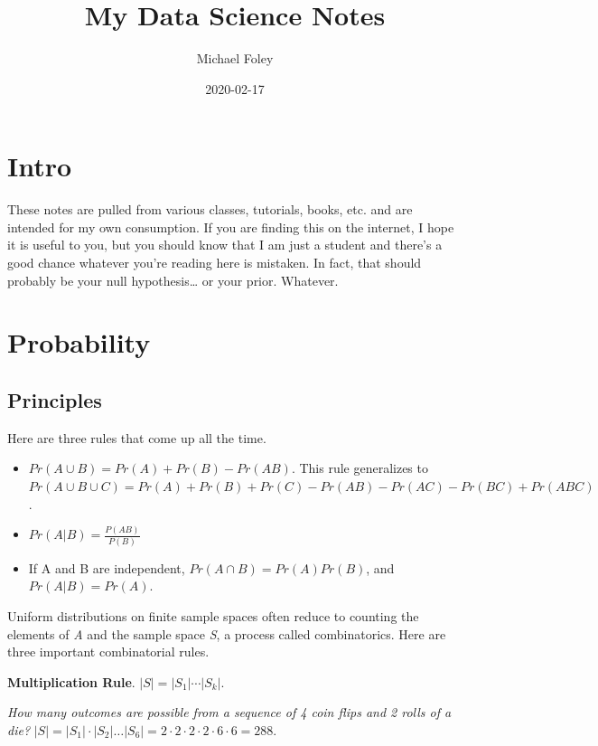 \documentclass[
]{book}
\title{My Data Science Notes}
\author{Michael Foley}
\date{2020-02-17}
\begin{document}
\maketitle

{
\setcounter{tocdepth}{1}
\tableofcontents
}
\hypertarget{intro}{%
\chapter*{Intro}\label{intro}}

These notes are pulled from various classes, tutorials, books, etc. and are intended for my own consumption. If you are finding this on the internet, I hope it is useful to you, but you should know that I am just a student and there's a good chance whatever you're reading here is mistaken. In fact, that should probably be your null hypothesis\ldots{} or your prior. Whatever.

\hypertarget{probability}{%
\chapter{Probability}\label{probability}}

\hypertarget{principles}{%
\section{Principles}\label{principles}}

Here are three rules that come up all the time.

\begin{itemize}
\item
  \(Pr(A \cup B) = Pr(A)+Pr(B) - Pr(AB)\). This rule generalizes to
  \(Pr(A \cup B \cup C)=Pr(A)+Pr(B)+Pr(C)-Pr(AB)-Pr(AC)-Pr(BC)+Pr(ABC)\).
\item
  \(Pr(A|B) = \frac{P(AB)}{P(B)}\)
\item
  If A and B are independent, \(Pr(A \cap B) = Pr(A)Pr(B)\), and \(Pr(A|B)=Pr(A)\).
\end{itemize}

Uniform distributions on finite sample spaces often reduce to counting the elements of \emph{A} and the sample space \emph{S}, a process called combinatorics. Here are three important combinatorial rules.

\textbf{Multiplication Rule}. \(|S|=|S_1 |⋯|S_k|\).

\emph{How many outcomes are possible from a sequence of 4 coin flips and 2 rolls of a die?}
\(|S|=|S_1| \cdot |S_2| \dots |S_6| = 2 \cdot 2 \cdot 2 \cdot 2 \cdot 6 \cdot 6 = 288\).
\end{document}
